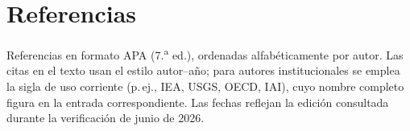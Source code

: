 \documentclass[11pt,letterpaper]{report}
\begin{document}
\chapter*{Referencias}
\noindent\footnotesize
Referencias en formato APA (7.\textsuperscript{a} ed.), ordenadas alfabéticamente por autor. Las citas en el texto usan el estilo
autor--año; para autores institucionales se emplea la sigla de uso corriente (p.\,ej., IEA, USGS, OECD, IAI), cuyo nombre completo
figura en la entrada correspondiente. Las fechas reflejan la edición consultada durante la verificación de junio de 2026.

\vspace{4pt}
\end{document}
